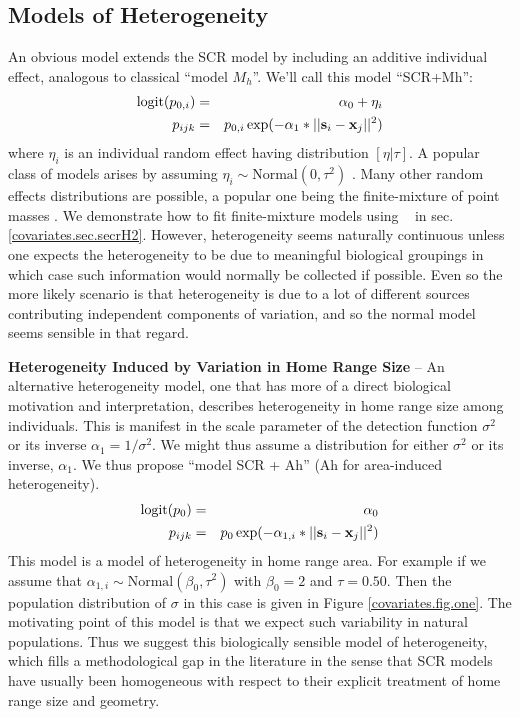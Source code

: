 \subsection{Models of Heterogeneity}
\label{covariates.sec.heterogeneity}

An obvious model extends the SCR model by including an additive
individual effect, analogous to classical ``model $M_{h}$''. We'll
call this model ``SCR+Mh'':
\begin{eqnarray*}
\mbox{logit}(p_{0,i})& =& \alpha_0 + \eta_{i} \\
p_{ijk}& = &p_{0,i} \exp(- \alpha_1*||{\bf s}_{i}-{\bf x}_{j}||^2)
\end{eqnarray*}
where $\eta_{i}$ is an individual random effect having distribution
$[\eta|\tau]$.  A popular class of models arises by assuming
$\eta_{i} \sim \mbox{Normal}(0,\tau^{2})$ \citep{coull_agresti:1999,
dorazio_royle:2003}.  Many other random effects
distributions are possible, a popular one being the finite-mixture of
point masses
\citep{norris_pollock:1996, pledger:2000}. 
We demonstrate how to fit 
finite-mixture models using \secr~ in sec. \ref{covariates.sec.secrH2}.  However, 
heterogeneity seems naturally continuous unless one expects the heterogeneity to be 
due to meaningful biological groupings in which case such information would normally 
be collected if possible.  Even so the more likely scenario is that heterogeneity 
is due to a lot of different sources contributing independent components of variation, 
and so the normal model seems sensible in that regard.  

{\bf Heterogeneity Induced by Variation in Home Range Size} -- An
alternative heterogeneity model, one that has more of a direct
biological motivation and interpretation, describes heterogeneity in
home range size among individuals. This is manifest in the scale
parameter of the detection function $\sigma^{2}$ or its inverse
$\alpha_1 = 1/\sigma^{2}$. We might thus assume a distribution for
either $\sigma^{2}$ or its inverse, $\alpha_1$.  We thus propose
``model SCR + Ah'' (Ah for area-induced heterogeneity).
\begin{eqnarray*}
\mbox{logit}(p_{0}) &=& \alpha_0   \\
p_{ijk} &=& p_{0} \exp(- \alpha_{1,i}*||{\bf s}_{i}-{\bf x}_{j}||^2)
\end{eqnarray*}
This model is a model of heterogeneity in home range area. For example
if we assume that $\alpha_{1,i} \sim \mbox{Normal}(\beta_0,\tau^{2})$
with $\beta_{0} = 2$ and $\tau = 0.50$. Then the population
distribution of $\sigma$ in this case is given in Figure
\ref{covariates.fig.one}. The motivating point of this model is that we expect
such variability in natural populations. Thus we suggest this
biologically sensible model of heterogeneity, which fills a
methodological gap in the literature in the sense that SCR models have
usually  been homogeneous with respect to their explicit treatment of home
range size and geometry.

